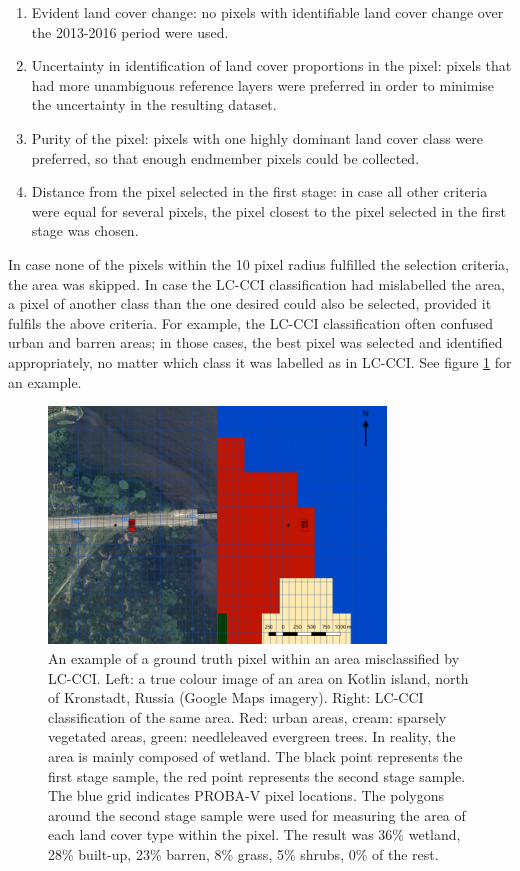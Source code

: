 \documentclass[a4paper,12pt]{scrbook}
\begin{document}
\begin{enumerate}
 \item Evident land cover change: no pixels with identifiable land cover change over the 2013-2016 period were used.
 \item Uncertainty in identification of land cover proportions in the pixel: pixels that had more unambiguous reference layers were preferred in order to minimise the uncertainty in the resulting dataset.
 \item Purity of the pixel: pixels with one highly dominant land cover class were preferred, so that enough endmember pixels could be collected.
 \item Distance from the pixel selected in the first stage: in case all other criteria were equal for several pixels, the pixel closest to the pixel selected in the first stage was chosen.
\end{enumerate}

In case none of the pixels within the 10 pixel radius fulfilled the selection criteria, the area was skipped. In case the LC-CCI classification had mislabelled the area, a pixel of another class than the one desired could also be selected, provided it fulfils the above criteria. For example, the LC-CCI classification often confused urban and barren areas; in those cases, the best pixel was selected and identified appropriately, no matter which class it was labelled as in LC-CCI. See figure \ref{fig-sampling} for an example.

\begin{figure}
 \centering
 \includegraphics[width=0.8\textwidth]{./thesis-figures/classification-example.png}
 \caption{An example of a ground truth pixel within an area misclassified by LC-CCI. Left: a true colour image of an area on Kotlin island, north of Kronstadt, Russia (Google Maps imagery). Right: LC-CCI classification of the same area. Red: urban areas, cream: sparsely vegetated areas, green: needleleaved evergreen trees. In reality, the area is mainly composed of wetland. The black point represents the first stage sample, the red point represents the second stage sample. The blue grid indicates PROBA-V pixel locations. The polygons around the second stage sample were used for measuring the area of each land cover type within the pixel. The result was 36\% wetland, 28\% built-up, 23\% barren, 8\% grass, 5\% shrubs, 0\% of the rest.}
 \label{fig-sampling}
\end{figure}
\end{document}
